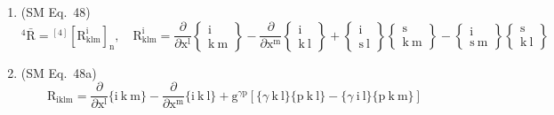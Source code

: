 \documentclass[12pt]{article}
\begin{document}
\begin{enumerate}[label=(\arabic*), series=formellist]
    \item (SM Eq.\ 48) 
    \[
    {}^4\bar{\mathrm{R}} = {}^{[4]}\left[ \mathrm{R}^\mathrm{i}_{\mathrm{klm}} \right]_\mathrm{n}, \quad \mathrm{R}^\mathrm{i}_{\mathrm{klm}} = \frac{\partial}{\partial \mathrm{x^l}}\left\{ \begin{smallmatrix} \mathrm{i} \\ \mathrm{k\ m} \end{smallmatrix} \right\} - \frac{\partial}{\partial \mathrm{x^m}}\left\{ \begin{smallmatrix} \mathrm{i} \\ \mathrm{k\ l} \end{smallmatrix} \right\} + \left\{ \begin{smallmatrix} \mathrm{i} \\ \mathrm{s\ l} \end{smallmatrix} \right\}\left\{ \begin{smallmatrix} \mathrm{s} \\ \mathrm{k\ m} \end{smallmatrix} \right\} - \left\{ \begin{smallmatrix} \mathrm{i} \\ \mathrm{s\ m} \end{smallmatrix} \right\}\left\{ \begin{smallmatrix} \mathrm{s} \\ \mathrm{k\ l} \end{smallmatrix} \right\}
    \]

    \item (SM Eq.\ 48a) 
    \[
    \mathrm{R}_{\mathrm{iklm}} = \frac{\partial}{\partial \mathrm{x^l}}\{ \mathrm{i\ k\ m} \} - \frac{\partial}{\partial \mathrm{x^m}}\{ \mathrm{i\ k\ l} \} + \mathrm{g}^{\gamma\mathrm{p}} \left[ \{ \gamma\ \mathrm{k\ l} \}\{ \mathrm{p\ k\ l} \} - \{ \gamma\ \mathrm{i\ l} \}\{ \mathrm{p\ k\ m} \} \right]
    \]


\end{enumerate}
\end{document}
